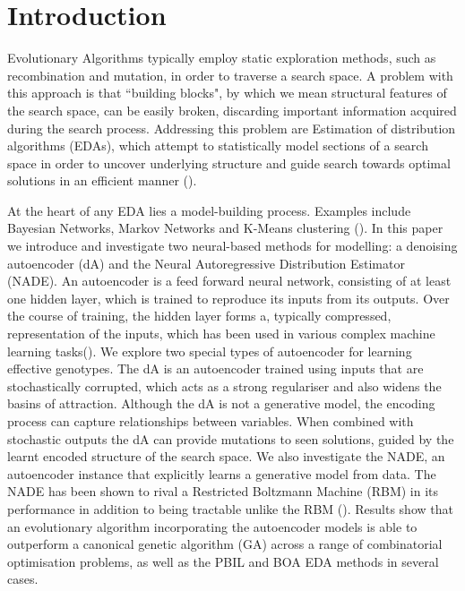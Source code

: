 \documentclass[twoside]{article}
\begin{document}
\section{Introduction}
Evolutionary Algorithms typically employ static exploration methods, such as recombination and mutation, in order to traverse a search space. A problem with this approach is that ``building blocks", by which we mean structural features of the search space, can be easily broken, discarding important information acquired during the search process. Addressing this problem are Estimation of distribution algorithms (EDAs), which attempt to statistically model sections of a search space in order to uncover underlying structure and guide search towards optimal solutions in an efficient manner (\cite{pelikan2006scalable}).

At the heart of any EDA lies a model-building process. Examples include Bayesian Networks, Markov Networks and K-Means clustering (\cite{pelikan2002survey}). In this paper we introduce and investigate two neural-based methods for modelling: a denoising autoencoder (dA) and the Neural Autoregressive Distribution Estimator (NADE). An autoencoder is a feed forward neural network, consisting of at least one hidden layer, which is trained to reproduce its inputs from its outputs. Over the course of training, the hidden layer forms a, typically compressed, representation of the inputs, which has been used in various complex machine learning tasks(\cite{hinton2006reducing}). We explore two special types of autoencoder for learning effective genotypes. The dA is an autoencoder trained using inputs that are stochastically corrupted, which acts as a strong regulariser and also widens the basins of attraction. Although the dA is not a generative model, the encoding process can capture relationships between variables. When combined with stochastic outputs the dA can provide mutations to seen solutions, guided by the learnt encoded structure of the search space. %
We also investigate the NADE, an autoencoder instance that explicitly learns a generative model from data. The NADE has been shown to rival a Restricted Boltzmann Machine (RBM) in its performance in addition to being tractable unlike the RBM (\cite{larochelle2011neural}). Results show that an evolutionary algorithm incorporating the autoencoder models is able to outperform a canonical genetic algorithm (GA) across a range of combinatorial optimisation problems, as well as the PBIL and BOA EDA methods in several cases.
\end{document}
